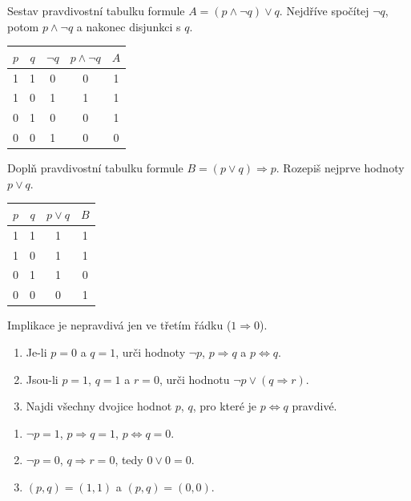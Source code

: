 \documentclass[11pt,a4paper]{article}
\begin{document}
\begin{prikladReseniBox}[title={Příklad 4}]
Sestav pravdivostní tabulku formule $A=(p\land\neg q)\lor q$.
\tcblower
Nejdříve spočítej $\neg q$, potom $p\land\neg q$ a nakonec disjunkci s $q$.
\begin{center}
\begin{tabular}{@{}ccccc@{}}
\toprule
$p$ & $q$ & $\neg q$ & $p\land\neg q$ & $A$\\
\midrule
1 & 1 & 0 & 0 & 1\\
1 & 0 & 1 & 1 & 1\\
0 & 1 & 0 & 0 & 1\\
0 & 0 & 1 & 0 & 0\\
\bottomrule
\end{tabular}
\end{center}
\end{prikladReseniBox}

\begin{zadaniReseniBox}[title={Samostatná práce 1}]
Doplň pravdivostní tabulku formule $B=(p\lor q)\Rightarrow p$. Rozepiš nejprve hodnoty $p\lor q$.
\tcblower
\begin{center}
\begin{tabular}{@{}cccc@{}}
\toprule
$p$ & $q$ & $p\lor q$ & $B$\\
\midrule
1 & 1 & 1 & 1\\
1 & 0 & 1 & 1\\
0 & 1 & 1 & 0\\
0 & 0 & 0 & 1\\
\bottomrule
\end{tabular}
\end{center}
Implikace je nepravdivá jen ve třetím řádku ($1\Rightarrow0$).
\end{zadaniReseniBox}

\begin{zadaniReseniBox}[title={Samostatná práce 2}]
\begin{enumerate}[label=\alph*)]
  \item Je-li $p=0$ a $q=1$, urči hodnoty $\neg p$, $p\Rightarrow q$ a $p\Leftrightarrow q$.
  \item Jsou-li $p=1$, $q=1$ a $r=0$, urči hodnotu $\neg p\lor(q\Rightarrow r)$.
  \item Najdi všechny dvojice hodnot $p$, $q$, pro které je $p\Leftrightarrow q$ pravdivé.
\end{enumerate}
\tcblower
\begin{enumerate}[label=\alph*)]
  \item $\neg p=1$, $p\Rightarrow q=1$, $p\Leftrightarrow q=0$.
  \item $\neg p=0$, $q\Rightarrow r=0$, tedy $0\lor0=0$.
  \item $(p,q)=(1,1)$ a $(p,q)=(0,0)$.
\end{enumerate}
\end{zadaniReseniBox}
\end{document}
